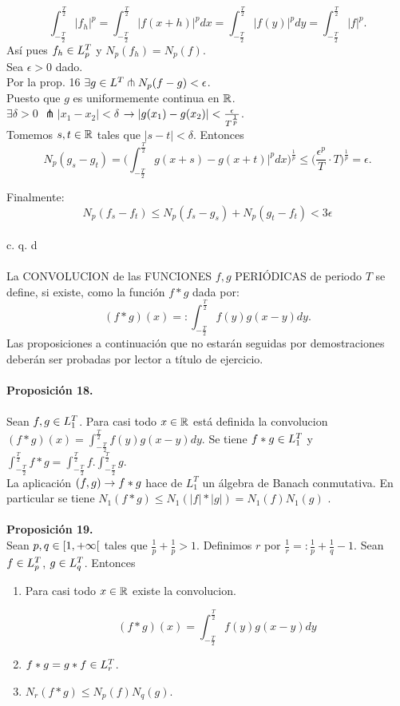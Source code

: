 $$
\int_{-\frac{T}{2}}^{\frac{T}{2}}|f_h|^p =\int_{-\frac{T}{2}}^{\frac{T}{2}}|f(x+h)|^p dx=\int_{-\frac{T}{2}}^{\frac{T}{2}}|f(y)|^p dy=\int_{-\frac{T}{2}}^{\frac{T}{2}}|f|^p.
$$
Así pues $f_h \in L_p^T$ y $N_p(f_h)=N_p(f)$. \\
Sea $\epsilon >0$ dado. \\
Por la prop. 16 $\exists g \in L^T \pitchfork N_p (f-g) < \epsilon$. \\
Puesto que $g$ es uniformemente continua en $\mathbb{R}$. \\
$\exists \delta>0$ $\pitchfork |x_1 - x_2| <\delta$ $\rightarrow |g(x_1)-g(x_2)|<\frac{\epsilon}{T^\frac{1}{p}}$.\\
Tomemos $s,t \in \mathbb{R}$ tales que $|s-t|<\delta$. Entonces
$$
N_p(g_s-g_t)=\biggl(\int_{-\frac{T}{2}}^{\frac{T}{2}} g(x+s)-g(x+t)|^p dx\biggl)^\frac{1}{p} \leq \biggl( \frac{\epsilon^p}{T}\cdot T \biggl)^\frac{1}{p}=\epsilon.
$$

Finalmente:
$$
N_p(f_s-f_t) \leq N_p(f_s - g_s) +N_p(g_t - f_t) < 3\epsilon
$$
 \\
 \phantom{sssssssssssssssssssssssssssssssssss sasdasdasdasdadadssada} c. q. d \\ \\
 La CONVOLUCION de las FUNCIONES $f,g$ PERIÓDICAS de periodo $T$ se define, si existe, como la función $f*g$ dada por:
 \begin{equation*}
 \boxed{(f*g)(x)=:\int_{-\frac{T}{2}}^{\frac{T}{2}}  f(y)g(x-y)dy.}
 \end{equation*}
 Las proposiciones a continuación que no estarán seguidas por demostraciones deberán ser probadas por lector a título de ejercicio. \\ \\
 \textbf{Proposición 18.}\\ \\
 Sean $f,g \in L_1 ^T$. Para casi todo $x\in \mathbb{R}$ está definida la convolucion $(f*g)(x)=\int_{-\frac{T}{2}}^{\frac{T}{2}}  f(y)g(x-y)dy$. Se tiene $f*g \in L_1^T$ y $\int_{-\frac{T}{2}}^{\frac{T}{2}}  f*g=\int_{-\frac{T}{2}}^{\frac{T}{2}} f. \int_{-\frac{T}{2}}^{\frac{T}{2}} g. $ \\
 La aplicación $(f,g) \rightarrow f*g$ hace de $L_1^T$ un álgebra de Banach conmutativa. En particular se tiene $N_1 (f*g) \leq N_1 (|f| * |g|)=N_1 (f) N_1 (g)$ .\\ \\
 \textbf{Proposición 19.} \\ 
 Sean $p,q \in [1,+\infty [$ tales que $\frac{1}{p}+ \frac{1}{p}>1$. Definimos $r$ por $\frac{1}{r}=:\frac{1}{p}+\frac{1}{q}-1$. Sean $f \in L_p^T$, $g \in L_q^T$. Entonces
 \begin{enumerate}[1)]
 \item Para casi todo $x \in \mathbb{R}$ existe la convolucion. 
 
 $$
 (f*g)(x)=\int_{-\frac{T}{2}}^{\frac{T}{2}}  f(y)g(x-y)dy
 $$
 \item $f*g=g*f \in L_r^T$.
 
 \item $N_r (f*g) \leq N_p (f) N_q (g)$.
 \end{enumerate}
 
